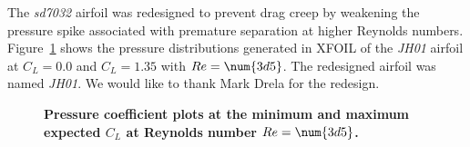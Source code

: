 The \emph{sd7032} airfoil was redesigned to prevent drag creep by weakening the pressure spike associated with premature separation at higher Reynolds numbers.  
Figure~\ref{f:jhcps} shows the pressure distributions generated in XFOIL of the \emph{JH01} airfoil at $C_L=0.0$ and $C_L=1.35$ with $Re=\num{3d5}$.
The redesigned airfoil was named \emph{JH01}. We would like to thank Mark Drela for the redesign.

\begin{figure}[H]
 \begin{subfigmatrix}{2}%
 \end{subfigmatrix}
 \caption{\textbf{Pressure coefficient plots at the minimum and maximum expected $C_L$ at Reynolds number $Re=\num{3d5}$.}}
 \label{f:jhcps}
\end{figure}


